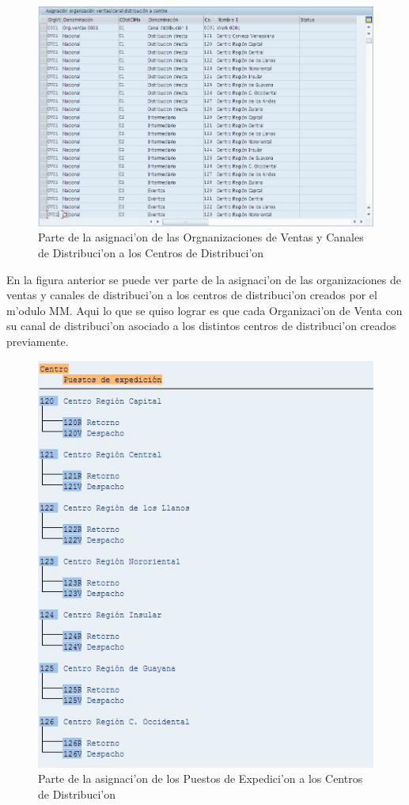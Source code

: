 \begin{figure}[H]
\centering
\includegraphics[scale=0.65,type=jpg,ext=.jpg,read=.jpg]{figures/OrgCanalCentro}
\caption{Parte de la asignaci'on de las Orgnanizaciones de Ventas y Canales de Distribuci'on a los Centros de Distribuci'on}
\label{fig:asigna5}
\end{figure}
	En la figura anterior se puede ver parte de la asignaci'on de las organizaciones de ventas y canales de distribuci'on a los centros de distribuci'on creados por el m'odulo MM. Aqui lo que se quiso lograr es que cada Organizaci'on de Venta con su canal de distribuci'on asociado a los distintos centros de distribuci'on creados previamente.
\begin{figure}[H]
\centering
\includegraphics[scale=0.65,type=jpg,ext=.jpg,read=.jpg]{figures/ExpedicionCentro}
\caption{Parte de la asignaci'on de los Puestos de Expedici'on a los Centros de Distribuci'on}
\label{fig:asigna6}
\end{figure}
